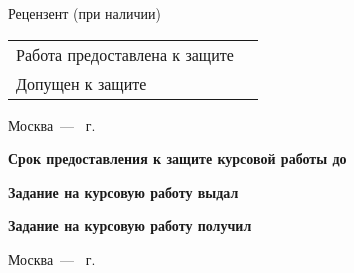 \documentclass{mirea-prog-lang}
\begin{document}
\begin{titlepage}
	Рецензент (при наличии)  \hfill{} \bigskip\par
	\begin{tabular}{@{}ll}
		Работа предоставлена к защите & \blankDate{}{} \bigskip\\
		Допущен к защите & \blankDate{}{}
	\end{tabular}
	\begin{center}
		\vfill Москва~--- \the\year{}~г.
	\end{center}
	\newpage
	\textbf{Срок предоставления к защите курсовой работы до} \hfill\blankDate{}{} \par
	\textbf{Задание на курсовую работу выдал}  \hfill{} \par
	\hfill\blankDate{}{} \par
	\textbf{Задание на курсовую работу получил}  \hfill{} \par\bigskip
	\begin{center}
		Москва~--- \the\year{}~г.
	\end{center}
\end{titlepage}
\addtocounter{page}{2}
\end{document}
